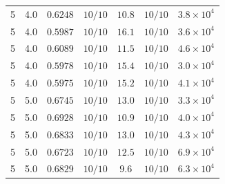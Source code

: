 \begin{tabular}{cc c cc cc}
5 & 4.0 & $0.6248$ & $10/10$ & $10.8$ & $10/10$ & $3.8 \times 10^{4}$ \\
5 & 4.0 & $0.5987$ & $10/10$ & $16.1$ & $10/10$ & $3.6 \times 10^{4}$ \\
5 & 4.0 & $0.6089$ & $10/10$ & $11.5$ & $10/10$ & $4.6 \times 10^{4}$ \\
5 & 4.0 & $0.5978$ & $10/10$ & $15.4$ & $10/10$ & $3.0 \times 10^{4}$ \\
5 & 4.0 & $0.5975$ & $10/10$ & $15.2$ & $10/10$ & $4.1 \times 10^{4}$ \\
5 & 5.0 & $0.6745$ & $10/10$ & $13.0$ & $10/10$ & $3.3 \times 10^{4}$ \\
5 & 5.0 & $0.6928$ & $10/10$ & $10.9$ & $10/10$ & $4.0 \times 10^{4}$ \\
5 & 5.0 & $0.6833$ & $10/10$ & $13.0$ & $10/10$ & $4.3 \times 10^{4}$ \\
5 & 5.0 & $0.6723$ & $10/10$ & $12.5$ & $10/10$ & $6.9 \times 10^{4}$ \\
5 & 5.0 & $0.6829$ & $10/10$ & $9.6$ & $10/10$ & $6.3 \times 10^{4}$ \\
\bottomrule
\end{tabular}

